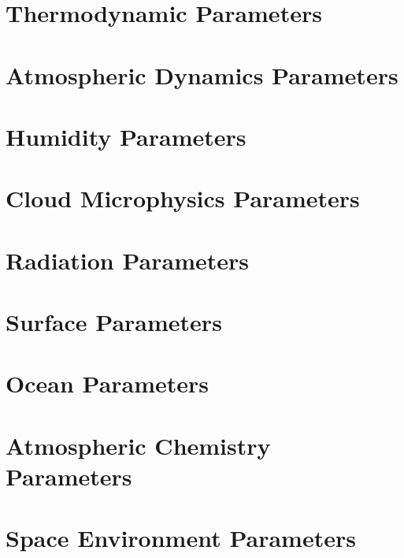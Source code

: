\documentclass[11pt,a4paper,oneside]{report}
\begin{document}
\chapter{Thermodynamic Parameters}



\chapter{Atmospheric Dynamics Parameters}



\chapter{Humidity Parameters}



\chapter{Cloud Microphysics Parameters}



\chapter{Radiation Parameters}



\chapter{Surface Parameters}



\chapter{Ocean Parameters}



\chapter{Atmospheric Chemistry Parameters}



\chapter{Space Environment Parameters}


\end{document}
